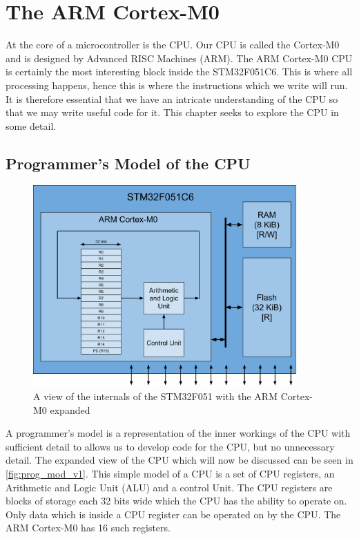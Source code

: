 \chapter{The ARM Cortex-M0}

At the core of a microcontroller is the CPU. Our CPU is called the Cortex-M0 and is designed by Advanced RISC Machines (ARM).
The ARM Cortex-M0 CPU is certainly the most interesting block inside the STM32F051C6. This is where all processing happens, hence this is where the instructions which we write will run. It is therefore essential that we have an intricate understanding of the CPU so that we may write useful code for it. This chapter seeks to explore the CPU in some detail.

\section{Programmer's Model of the CPU}
\begin{figure}[t]
  \centering
  \includegraphics[width=0.9\textwidth]{./fig/programmers_model_v1.pdf}
  \caption{A view of the internals of the STM32F051 with the ARM Cortex-M0 expanded}
  \label{fig:prog_mod_v1}
\end{figure}
A programmer's model is a representation of the inner workings of the CPU with sufficient detail to allows us to develop code for the CPU, but no unnecessary detail. The expanded view of the CPU which will now be discussed can be seen in \autoref{fig:prog_mod_v1}. This simple model of a CPU is a set of CPU registers, an Arithmetic and Logic Unit (ALU) and a control Unit. The CPU registers are blocks of storage each 32 bits wide which the CPU has the ability to operate on. Only data which is inside a CPU register can be operated on by the CPU. The ARM Cortex-M0 has 16 such registers. 

